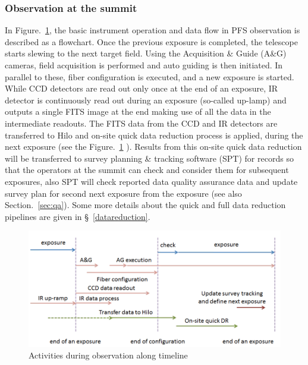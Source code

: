 \documentclass[a4paper,notitlepage]{article}
\begin{document}
\subsubsection{Observation at the summit}

In Figure.~\ref{fig:sciops-scireq-slide-oneexp}, the basic instrument
operation and data flow in PFS observation is described as a
flowchart. Once the previous exposure is completed, the telescope starts
slewing to the next target field. Using the Acquisition \& Guide (A\&G)
cameras, field acquisition is performed and auto guiding is then
initiated. In parallel to these, fiber configuration is executed, and a
new exposure is started. While CCD detectors are read out only once at
the end of an exposure, IR detector is continuously read out during an
exposure (so-called up-lamp) and outputs a single FITS image at the end
making use of all the data in the intermediate readouts. The FITS data
from the CCD and IR detectors are transferred to Hilo and on-site quick
data reduction process is applied, during the next exposure (see the
Figure.~\ref{fig:sciops-scireq-slide-oneexp}
). Results from this on-site quick data reduction will be transferred to
survey planning \& tracking software (SPT) for records so that the operators
at the summit can check and consider them for subsequent exposures, 
also SPT will check reported data quality assurance data and update survey 
plan for second next exposure from the exposure 
(see also Section.~\ref{sec:qa}). 
Some
more details about the quick and full data reduction pipelines are given
in \S~\ref{datareduction}.

\begin{figure}[htb]
  \begin{center}
    \includegraphics[width=.75\linewidth]{sciops-scireq-slide-oneexp.png}
  \end{center}
  \caption{Activities during observation along timeline}
  \label{fig:sciops-scireq-slide-oneexp}
\end{figure}
\end{document}
